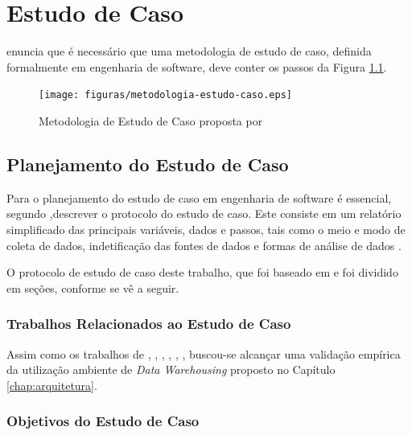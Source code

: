 \chapter{Estudo de Caso}
\label{estudo de caso}


 enuncia que é necessário que uma metodologia de estudo de caso, definida formalmente em engenharia de software, deve conter os passos da Figura \ref{fig:metodologia-estudo}.

\begin{figure}[ht!]
\centering
\texttt{[image: figuras/metodologia-estudo-caso.eps]}
\caption{Metodologia de Estudo de Caso proposta por }
\label{fig:metodologia-estudo}
\end{figure}
\FloatBarrier

\section{Planejamento do Estudo de Caso}

Para o planejamento do estudo de caso em engenharia de software é essencial, segundo ,descrever o protocolo do estudo de caso. Este consiste em um relatório simplificado das principais variáveis, dados e passos, tais como o meio e modo de coleta de dados, indetificação das fontes de dados e formas de análise de dados \cite{wohlin2012experimentation}. 


O protocolo de estudo de caso deste trabalho, que foi baseado em  e  foi dividido em seções, conforme se vê a seguir.


\subsection{Trabalhos Relacionados ao Estudo de Caso}

Assim como os trabalhos de , , , , , , buscou-se alcançar uma validação empírica da utilização ambiente de \textit{Data Warehousing} proposto no Capítulo \ref{chap:arquitetura}.


\subsection{Objetivos do Estudo de Caso}

